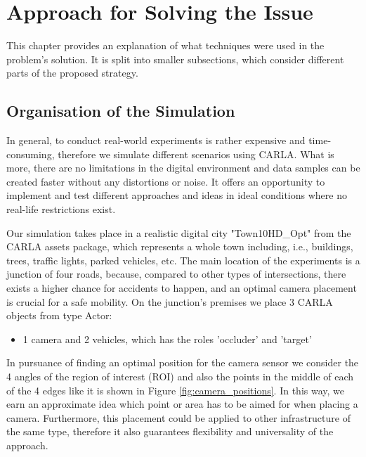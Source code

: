 \chapter{Approach for Solving the Issue}
\label{mainone}

This chapter provides an explanation of what techniques were used in the problem's solution. It is split into smaller subsections, which consider different parts of the proposed strategy.

\section{Organisation of the Simulation}
In general, to conduct real-world experiments is rather expensive and time-consuming, therefore we simulate different scenarios using CARLA. What is more, there are no limitations in the digital environment and data samples can be created faster without any distortions or noise. It offers an opportunity to implement and test different approaches and ideas in ideal conditions where no real-life restrictions exist.

Our simulation takes place in a realistic digital city "Town10HD\_Opt" from the CARLA assets package, which represents a whole town including, i.e., buildings, trees, traffic lights, parked vehicles, etc. The main location of the experiments is a junction of four roads, because, compared to other types of intersections, there exists a higher chance for accidents to happen, and an optimal camera placement is crucial for a safe mobility. On the junction's premises we place 3 CARLA objects from type Actor: 
\begin{itemize}
    \item 1 camera and 2 vehicles, which has the roles 'occluder' and 'target'
\end{itemize}
In pursuance of finding an optimal position for the camera sensor we consider the 4 angles of the region of interest (ROI) and also the points in the middle of each of the 4 edges like it is shown in Figure \ref{fig:camera_positions}. In this way, we earn an approximate idea which point or area has to be aimed for when placing a camera. Furthermore, this placement could be applied to other infrastructure of the same type, therefore it also guarantees flexibility and universality of the approach. 

